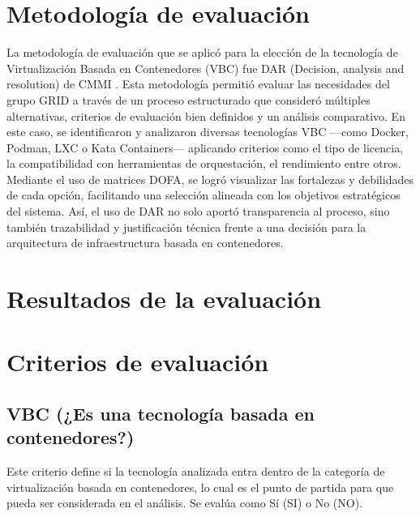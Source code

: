 \label{cap:dar}

\section{Metodología de evaluación}

La metodología de evaluación que se aplicó para la elección de la tecnología de Virtualización Basada en Contenedores (VBC) fue DAR (Decision, analysis and resolution) de CMMI \citep{CMMIInstitute2010}. Esta metodología permitió evaluar las necesidades del grupo GRID a través de un proceso estructurado que consideró múltiples alternativas, criterios de evaluación bien definidos y un análisis comparativo. En este caso, se identificaron y analizaron diversas tecnologías VBC —como Docker, Podman, LXC o Kata Containers— aplicando criterios como el tipo de licencia, la compatibilidad con herramientas de orquestación, el rendimiento entre otros. Mediante el uso de matrices DOFA, se logró visualizar las fortalezas y debilidades de cada opción, facilitando una selección alineada con los objetivos estratégicos del sistema. Así, el uso de DAR no solo aportó transparencia al proceso, sino también trazabilidad y justificación técnica frente a una decisión para la arquitectura de infraestructura basada en contenedores.

\section{Resultados de la evaluación}



\section{Criterios de evaluación}

\subsection{VBC (¿Es una tecnología basada en contenedores?)}
Este criterio define si la tecnología analizada entra dentro de la categoría de virtualización basada en contenedores, lo cual es el punto de partida para que pueda ser considerada en el análisis. Se evalúa como Sí (SI) o No (NO).

